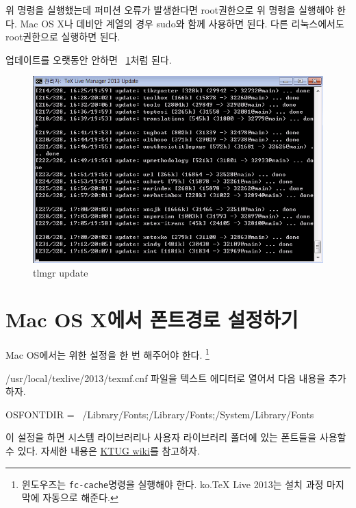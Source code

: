 \documentclass[oneside, chapter, 11pt]{oblivoir}
\begin{document}

위 명령을 실행했는데 퍼미션 오류가 발생한다면 root권한으로 위 명령을 실행해야 한다. Mac OS X나 데비안 계열의 경우 sudo와 함께 사용하면 된다. 다른 리눅스에서도 root권한으로 실행하면 된다.

업데이트를 오랫동안 안하면 \figurename~\ref{fig:update}처럼 된다.
\begin{figure}
\caption{tlmgr update}
\label{fig:update}
\includegraphics[width=\textwidth]{tlmgr-update}
\end{figure}

\section{Mac OS X에서 폰트경로 설정하기}
Mac OS에서는  위한 설정을 한 번 해주어야 한다. \footnote{윈도우즈는 \texttt{fc-cache}명령을 실행해야 한다. ko.TeX Live 2013는 설치 과정 마지막에 자동으로 해준다.}

/usr/local/texlive/2013/texmf.cnf 파일을 텍스트 에디터로 열어서 다음 내용을 추가하자.

\begin{pyglist}[language=bash]
OSFONTDIR = {~/Library/Fonts;/Library/Fonts;/System/Library/Fonts}
\end{pyglist}

이 설정을 하면 시스템 라이브러리나 사용자 라이브러리 폴더에 있는 폰트들을  사용할 수 있다. 
자세한 내용은 \href{http://wiki.ktug.org/wiki/wiki.php/MacOSInstall}{KTUG wiki}를 참고하자.
\end{document}
